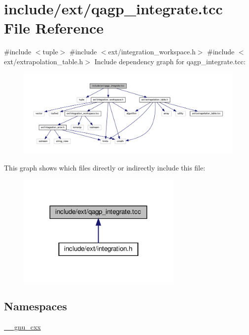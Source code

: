 \hypertarget{qagp__integrate_8tcc}{}\section{include/ext/qagp\+\_\+integrate.tcc File Reference}
\label{qagp__integrate_8tcc}
{\ttfamily \#include $<$tuple$>$}\newline
{\ttfamily \#include $<$ext/integration\+\_\+workspace.\+h$>$}\newline
{\ttfamily \#include $<$ext/extrapolation\+\_\+table.\+h$>$}\newline
Include dependency graph for qagp\+\_\+integrate.\+tcc\+:
\nopagebreak
\begin{figure}[H]
\begin{center}
\leavevmode
\includegraphics[width=350pt]{qagp__integrate_8tcc__incl}
\end{center}
\end{figure}
This graph shows which files directly or indirectly include this file\+:
\nopagebreak
\begin{figure}[H]
\begin{center}
\leavevmode
\includegraphics[width=227pt]{qagp__integrate_8tcc__dep__incl}
\end{center}
\end{figure}
\subsection*{Namespaces}
\begin{DoxyCompactItemize}
\item 
 \hyperlink{namespace____gnu__cxx}{\+\_\+\+\_\+gnu\+\_\+cxx}
\end{DoxyCompactItemize}
